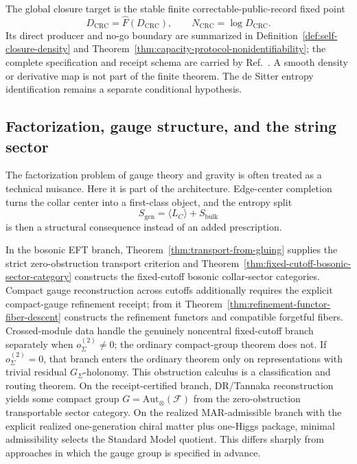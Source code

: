 \documentclass[11pt]{article}
\begin{document}
The global closure target is the stable finite correctable-public-record fixed point
\[
D_{\mathrm{CRC}}=\widehat F(D_{\mathrm{CRC}}),
\qquad
N_{\mathrm{CRC}}=\log D_{\mathrm{CRC}}.
\]
Its direct producer and no-go boundary are summarized in
Definition~\ref{def:self-closure-density} and
Theorem~\ref{thm:capacity-protocol-nonidentifiability}; the complete specification and receipt
schema are carried by Ref.~\cite{ophsynthesis}. A smooth density or derivative map is not part of the finite theorem.
The de Sitter entropy identification remains a separate conditional hypothesis.

\subsection{Factorization, gauge structure, and the string sector}

The factorization problem of gauge theory and gravity is often treated as a technical nuisance. Here it is part of the architecture. Edge-center completion turns the collar center into a first-class object, and the entropy split
\[
S_{\mathrm{gen}}=\langle L_C\rangle + S_{\mathrm{bulk}}
\]
is then a structural consequence instead of an added prescription.

In the bosonic EFT branch, Theorem~\ref{thm:transport-from-gluing} supplies the strict zero-obstruction transport criterion and Theorem~\ref{thm:fixed-cutoff-bosonic-sector-category} constructs the fixed-cutoff bosonic collar-sector categories. Compact gauge reconstruction across cutoffs additionally requires the explicit compact-gauge refinement receipt; from it Theorem~\ref{thm:refinement-functor-fiber-descent} constructs the refinement functors and compatible forgetful fibers. Crossed-module data handle the genuinely noncentral fixed-cutoff branch separately when \(o^{(2)}_\Sigma\ne0\); the ordinary compact-group theorem does not. If \(o^{(2)}_\Sigma=0\), that branch enters the ordinary theorem only on representations with trivial residual \(G_\Sigma\)-holonomy. This obstruction calculus is a classification and routing theorem. On the receipt-certified branch, DR/Tannaka reconstruction yields some compact group \(G=\mathrm{Aut}_\otimes(\mathcal F)\) from the zero-obstruction transportable sector category. On the realized MAR-admissible branch with the explicit realized one-generation chiral matter plus one-Higgs package, minimal admissibility selects the Standard Model quotient. This differs sharply from approaches in which the gauge group is specified in advance.
\end{document}
